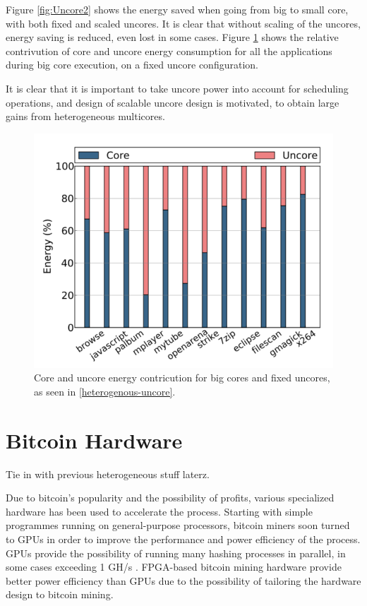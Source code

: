 Figure \ref{fig:Uncore2} shows the energy saved when going from big to small core, with both fixed and scaled uncores.
It is clear that without scaling of the uncores, energy saving is reduced, even lost in some cases.
Figure \ref{fig:Uncore3} shows the relative contrivution of core and uncore energy consumption for all the applications during big core execution, on a fixed uncore configuration.

It is clear that it is important to take uncore power into account for scheduling operations, and design of scalable uncore design is motivated, to obtain large gains from heterogeneous multicores. 

\begin{figure}[htb]
    \centering
    \includegraphics[width=1.0\textwidth]{Figures/Heterogeneous/Uncore3}
    \caption{Core and uncore energy contricution for big cores and fixed uncores, as seen in \ref{heterogenous-uncore}.}
    \label{fig:Uncore3}
\end{figure}

\section{Bitcoin Hardware}

Tie in with previous heterogeneous stuff laterz.

Due to bitcoin's popularity and the possibility of profits, various specialized hardware has been used
to accelerate the process. Starting with simple programmes running on general-purpose processors,
bitcoin miners soon turned to GPUs in order to improve the performance and power efficiency of the
process. GPUs provide the possibility of running many hashing processes in parallel, in some cases
exceeding 1 GH/s
. FPGA-based bitcoin mining hardware provide
better power efficiency than GPUs due to the possibility of tailoring the hardware design to
bitcoin mining.

